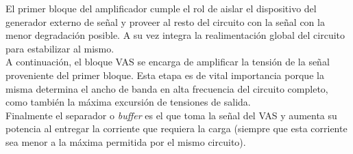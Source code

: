 
	El primer bloque del amplificador cumple el rol de aislar el dispositivo del generador externo de señal y proveer al resto del circuito con la señal con la menor degradación posible. A su vez integra la realimentación global del circuito para estabilizar al mismo.\\

	\indent A continuación, el bloque VAS se encarga de amplificar la tensión de la señal proveniente del primer bloque. Esta etapa es de vital importancia porque la misma determina el ancho de banda en alta frecuencia del circuito completo, como también la máxima excursión de tensiones de salida.\\

	\indent Finalmente el separador o \emph{buffer} es el que toma la señal del VAS y aumenta su potencia al entregar la corriente que requiera la carga (siempre que esta corriente sea menor a la máxima permitida por el mismo circuito).


